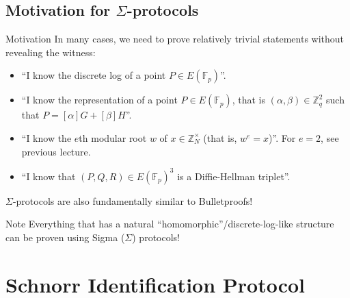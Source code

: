 \documentclass[xcolor={usenames,dvipsnames}]{beamer}
\begin{document}
    \subsection{Motivation for $\Sigma$-protocols}
    \begin{frame}{Motivation}
        In many cases, we need to prove relatively trivial statements without revealing the witness:
        \begin{itemize}
            \item ``I know the discrete log of a point $P \in E(\mathbb{F}_p)$''.
            \item ``I know the representation of a point $P \in E(\mathbb{F}_p)$, that is $(\alpha,\beta) \in \mathbb{Z}_q^2$ such that $P=[\alpha]G + [\beta]H$''.
            \item ``I know the $e$th modular root $w$ of $x \in \mathbb{Z}_N^{\times}$ (that is, $w^e=x$)''. \textcolor{blue!60!white}{For $e=2$, see previous lecture.}
            \item ``I know that $(P,Q,R) \in E(\mathbb{F}_p)^3$ is a Diffie-Hellman triplet''.
        \end{itemize}

        $\Sigma$-protocols are also fundamentally similar to Bulletproofs!

        \begin{alertblock}{Note}
            Everything that has a natural ``homomorphic''/discrete-log-like structure can be proven using Sigma ($\Sigma$) protocols!
        \end{alertblock}
    \end{frame}

    \section{Schnorr Identification Protocol}
\end{document}
